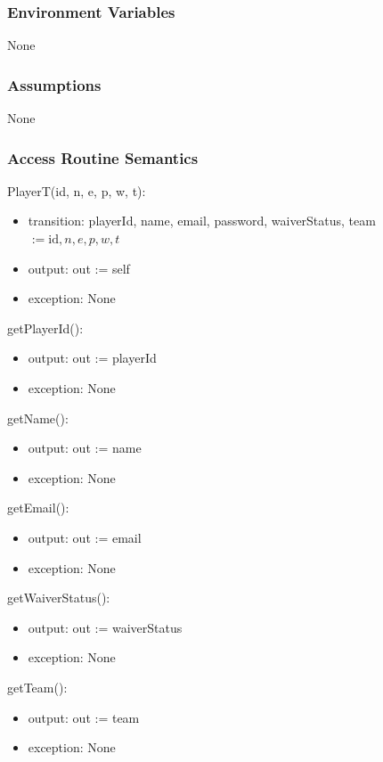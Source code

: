 \documentclass[12pt, titlepage]{article}
\begin{document}
\subsubsection{Environment Variables}
None

\subsubsection{Assumptions}
None

\subsubsection{Access Routine Semantics}

\noindent PlayerT(id, n, e, p, w, t):
\begin{itemize}
  \item transition: playerId, name, email, password, waiverStatus, team $:= \text{id}, n, e, p, w, t$
  \item output: out := self
  \item exception: None
\end{itemize}

\noindent getPlayerId():
\begin{itemize}
  \item output: out := playerId
  \item exception: None
\end{itemize}

\noindent getName():
\begin{itemize}
  \item output: out := name
  \item exception: None
\end{itemize}

\noindent getEmail():
\begin{itemize}
  \item output: out := email
  \item exception: None
\end{itemize}

\noindent getWaiverStatus():
\begin{itemize}
  \item output: out := waiverStatus
  \item exception: None
\end{itemize}

\noindent getTeam():
\begin{itemize}
  \item output: out := team
  \item exception: None
\end{itemize}
\end{document}
